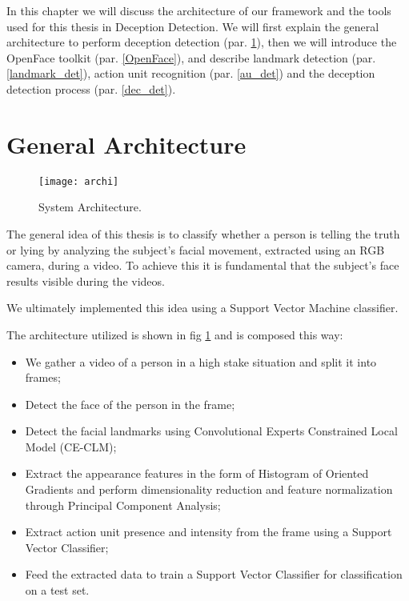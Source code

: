 In this chapter we will discuss the architecture of our framework and the tools used for this thesis in Deception Detection. We will first explain the general architecture to perform deception detection (par. \ref{ga}), then we will introduce the OpenFace toolkit (par. \ref{OpenFace}), and describe landmark detection (par. \ref{landmark_det}), action unit recognition (par. \ref{au_det}) and the deception detection process (par. \ref{dec_det}).

\section{General Architecture} \label{ga}

\begin{figure}[H]
	\centering
	\texttt{[image: archi]}
	\caption{System Architecture.}
	\label{fig:architecture}
\end{figure}

The general idea of this thesis is to classify whether a person is telling the truth or lying by analyzing the subject's facial movement, extracted using an RGB camera, during a video. To achieve this it is fundamental that the subject's face results visible during the videos.

We ultimately implemented this idea using a Support Vector Machine classifier. 

The architecture utilized is shown in fig \ref{fig:architecture} and is composed this way:

\begin{itemize}
	\item We gather a video of a person in a high stake situation and split it into frames;
	\item Detect the face of the person in the frame;
	\item Detect the facial landmarks using Convolutional Experts Constrained Local Model (CE-CLM);
	\item Extract the appearance features in the form of Histogram of Oriented Gradients and perform dimensionality reduction and feature normalization through Principal Component Analysis;
	\item Extract action unit presence and intensity from the frame using a Support Vector Classifier;
	\item Feed the extracted data to train a Support Vector Classifier for classification on a test set.
\end{itemize}

\clearpage

